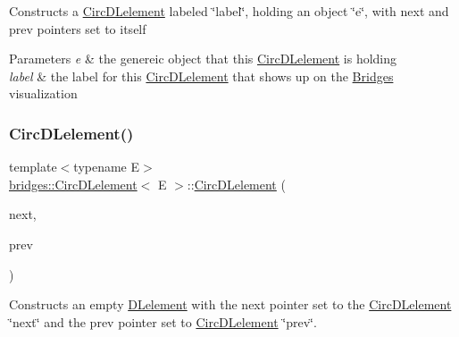 Constructs a \mbox{\hyperlink{classbridges_1_1_circ_d_lelement}{Circ\+D\+Lelement}} labeled \char`\"{}label\char`\"{}, holding an object \char`\"{}e\char`\"{}, with next and prev pointers set to itself 
\begin{DoxyParams}{Parameters}
{\em e} & the genereic object that this \mbox{\hyperlink{classbridges_1_1_circ_d_lelement}{Circ\+D\+Lelement}} is holding \\
\hline
{\em label} & the label for this \mbox{\hyperlink{classbridges_1_1_circ_d_lelement}{Circ\+D\+Lelement}} that shows up on the \mbox{\hyperlink{classbridges_1_1_bridges}{Bridges}} visualization \\
\hline
\end{DoxyParams}
\mbox{\label{classbridges_1_1_circ_d_lelement_a9d0cf8a5b60e3fedc1ba1ad792570934}} 
\subsubsection{\texorpdfstring{Circ\+D\+Lelement()}{CircDLelement()}\hspace{0.1cm}{\footnotesize\ttfamily [3/4]}}
{\footnotesize\ttfamily template$<$typename E$>$ \\
\mbox{\hyperlink{classbridges_1_1_circ_d_lelement}{bridges\+::\+Circ\+D\+Lelement}}$<$ E $>$\+::\mbox{\hyperlink{classbridges_1_1_circ_d_lelement}{Circ\+D\+Lelement}} (\begin{DoxyParamCaption}\item[{\mbox{\hyperlink{classbridges_1_1_circ_d_lelement}{Circ\+D\+Lelement}}$<$ E $>$}]{next,  }\item[{\mbox{\hyperlink{classbridges_1_1_circ_d_lelement}{Circ\+D\+Lelement}}$<$ E $>$}]{prev }\end{DoxyParamCaption})\hspace{0.3cm}{\ttfamily [inline]}}

Constructs an empty \mbox{\hyperlink{classbridges_1_1_d_lelement}{D\+Lelement}} with the next pointer set to the \mbox{\hyperlink{classbridges_1_1_circ_d_lelement}{Circ\+D\+Lelement}} \char`\"{}next\char`\"{} and the prev pointer set to \mbox{\hyperlink{classbridges_1_1_circ_d_lelement}{Circ\+D\+Lelement}} \char`\"{}prev\char`\"{}.


